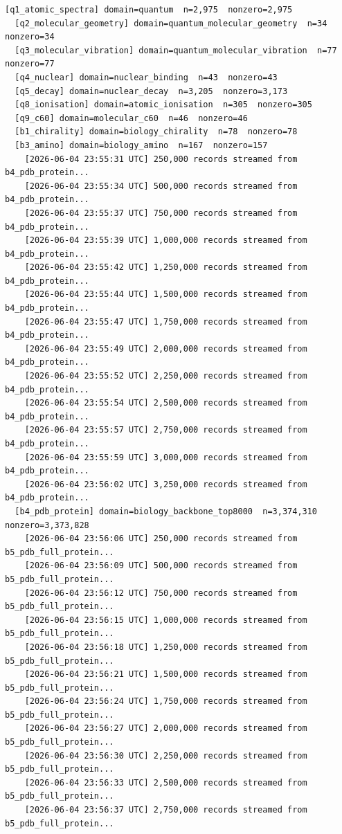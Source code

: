 \documentclass[11pt, letterpaper, openany]{book}
\begin{document}
\begin{empiricalbox}
\begin{lstlisting}[style=terminal]
  [q1_atomic_spectra] domain=quantum  n=2,975  nonzero=2,975
  [q2_molecular_geometry] domain=quantum_molecular_geometry  n=34  nonzero=34
  [q3_molecular_vibration] domain=quantum_molecular_vibration  n=77  nonzero=77
  [q4_nuclear] domain=nuclear_binding  n=43  nonzero=43
  [q5_decay] domain=nuclear_decay  n=3,205  nonzero=3,173
  [q8_ionisation] domain=atomic_ionisation  n=305  nonzero=305
  [q9_c60] domain=molecular_c60  n=46  nonzero=46
  [b1_chirality] domain=biology_chirality  n=78  nonzero=78
  [b3_amino] domain=biology_amino  n=167  nonzero=157
    [2026-06-04 23:55:31 UTC] 250,000 records streamed from b4_pdb_protein...
    [2026-06-04 23:55:34 UTC] 500,000 records streamed from b4_pdb_protein...
    [2026-06-04 23:55:37 UTC] 750,000 records streamed from b4_pdb_protein...
    [2026-06-04 23:55:39 UTC] 1,000,000 records streamed from b4_pdb_protein...
    [2026-06-04 23:55:42 UTC] 1,250,000 records streamed from b4_pdb_protein...
    [2026-06-04 23:55:44 UTC] 1,500,000 records streamed from b4_pdb_protein...
    [2026-06-04 23:55:47 UTC] 1,750,000 records streamed from b4_pdb_protein...
    [2026-06-04 23:55:49 UTC] 2,000,000 records streamed from b4_pdb_protein...
    [2026-06-04 23:55:52 UTC] 2,250,000 records streamed from b4_pdb_protein...
    [2026-06-04 23:55:54 UTC] 2,500,000 records streamed from b4_pdb_protein...
    [2026-06-04 23:55:57 UTC] 2,750,000 records streamed from b4_pdb_protein...
    [2026-06-04 23:55:59 UTC] 3,000,000 records streamed from b4_pdb_protein...
    [2026-06-04 23:56:02 UTC] 3,250,000 records streamed from b4_pdb_protein...
  [b4_pdb_protein] domain=biology_backbone_top8000  n=3,374,310  nonzero=3,373,828
    [2026-06-04 23:56:06 UTC] 250,000 records streamed from b5_pdb_full_protein...
    [2026-06-04 23:56:09 UTC] 500,000 records streamed from b5_pdb_full_protein...
    [2026-06-04 23:56:12 UTC] 750,000 records streamed from b5_pdb_full_protein...
    [2026-06-04 23:56:15 UTC] 1,000,000 records streamed from b5_pdb_full_protein...
    [2026-06-04 23:56:18 UTC] 1,250,000 records streamed from b5_pdb_full_protein...
    [2026-06-04 23:56:21 UTC] 1,500,000 records streamed from b5_pdb_full_protein...
    [2026-06-04 23:56:24 UTC] 1,750,000 records streamed from b5_pdb_full_protein...
    [2026-06-04 23:56:27 UTC] 2,000,000 records streamed from b5_pdb_full_protein...
    [2026-06-04 23:56:30 UTC] 2,250,000 records streamed from b5_pdb_full_protein...
    [2026-06-04 23:56:33 UTC] 2,500,000 records streamed from b5_pdb_full_protein...
    [2026-06-04 23:56:37 UTC] 2,750,000 records streamed from b5_pdb_full_protein...

\end{lstlisting}
\end{empiricalbox}
\end{document}
